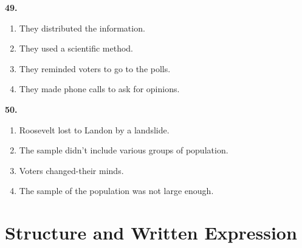 \documentclass[12pt]{article}
\begin{document}
\par
\vspace{0.25\baselineskip}
\noindent\textbf{49.}
\begin{enumerate}[label=(\Alph*),leftmargin=*,itemsep=0.2em]
\item They distributed the information.
\item They used a scientific method.
\item They reminded voters to go to the polls.
\item They made phone calls to ask for opinions.
\end{enumerate}
\par
\vspace{0.25\baselineskip}
\noindent\textbf{50.}
\begin{enumerate}[label=(\Alph*),leftmargin=*,itemsep=0.2em]
\item Roosevelt lost to Landon by a landslide.
\item The sample didn't include various groups of population.
\item Voters changed-their minds.
\item The sample of the population was not large enough.
\end{enumerate}
\par
\vspace{0.25\baselineskip}
\section*{Structure and Written Expression}
\end{document}
